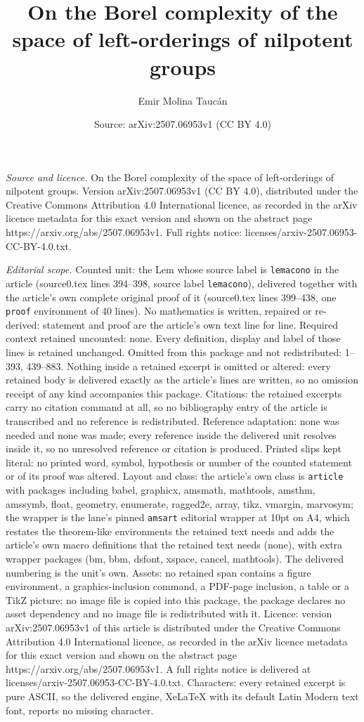\documentclass[10pt,a4paper]{amsart}
\title[On the Borel complexity of the space of left-orderings of ni]{On the Borel complexity of the space of left-orderings of nilpotent groups}
\author{Emir Molina Tauc\'an}
\date{Source: arXiv:2507.06953v1 (CC BY 4.0)}
\begin{document}
\maketitle

\noindent\emph{Source and licence.} On the Borel complexity of the space of left-orderings of nilpotent groups. Version arXiv:2507.06953v1 (CC BY 4.0), distributed under the Creative Commons Attribution 4.0 International licence, as recorded in the arXiv licence metadata for this exact version and shown on the abstract page https://arxiv.org/abs/2507.06953v1. Full rights notice: licenses/arxiv-2507.06953-CC-BY-4.0.txt.\par\smallskip

\noindent\textit{Editorial scope.} Counted unit: the Lem whose source label is \texttt{lemacono} in the article (source0.tex lines 394--398, source label \texttt{lemacono}), delivered together with the article's own complete original proof of it (source0.tex lines 399--438, one \texttt{proof} environment of 40 lines). No mathematics is written, repaired or re-derived: statement and proof are the article's own text line for line. Required context retained uncounted: none. Every definition, display and label of those lines is retained unchanged. Omitted from this package and not redistributed: 1--393, 439--883. Nothing inside a retained excerpt is omitted or altered: every retained body is delivered exactly as the article's lines are written, so no omission receipt of any kind accompanies this package. Citations: the retained excerpts carry no citation command at all, so no bibliography entry of the article is transcribed and no reference is redistributed. Reference adaptation: none was needed and none was made; every reference inside the delivered unit resolves inside it, so no unresolved reference or citation is produced. Printed slips kept literal: no printed word, symbol, hypothesis or number of the counted statement or of its proof was altered. Layout and class: the article's own class is \texttt{article} with packages including babel, graphicx, amsmath, mathtools, amsthm, amssymb, float, geometry, enumerate, ragged2e, array, tikz, vmargin, marvosym; the wrapper is the lane's pinned \texttt{amsart} editorial wrapper at 10pt on A4, which restates the theorem-like environments the retained text needs and adds the article's own macro definitions that the retained text needs (none), with extra wrapper packages (bm, bbm, dsfont, xspace, cancel, mathtools). The delivered numbering is the unit's own. Assets: no retained span contains a figure environment, a graphics-inclusion command, a PDF-page inclusion, a table or a TikZ picture; no image file is copied into this package, the package declares no asset dependency and no image file is redistributed with it. Licence: version arXiv:2507.06953v1 of this article is distributed under the Creative Commons Attribution 4.0 International licence, as recorded in the arXiv licence metadata for this exact version and shown on the abstract page https://arxiv.org/abs/2507.06953v1. A full rights notice is delivered at licenses/arxiv-2507.06953-CC-BY-4.0.txt. Characters: every retained excerpt is pure ASCII, so the delivered engine, XeLaTeX with its default Latin Modern text font, reports no missing character.
\end{document}
